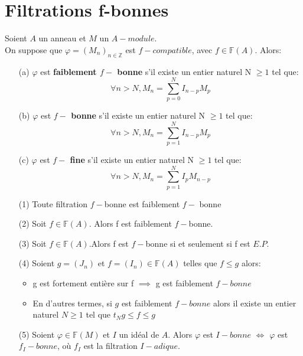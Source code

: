 \section{Filtrations f-bonnes}
\begin{madefinition}
	Soient $A$ un anneau et $M$ un $A-module$.\\
	On suppose que $\varphi=(M_n)_{n \in \mathbb{Z}}$ est $f-compatible$, avec $f \in \mathbb{F}(A)$. Alors:
	\begin{itemize}
		\item[(a)] $\varphi$ est \textbf{faiblement $f-$ bonne} s'il existe un entier naturel N $\geqslant 1$ tel que:
		\[\forall n > N, M_{n}=\sum_{p=0}^{N}I_{n-p}M_{p} \]
		\item[(b)] $\varphi$ est \textbf{$f-$ bonne} s'il existe un entier naturel N $\geqslant 1$ tel que:
		\[\forall n > N, M_{n}=\sum_{p=1}^{N}I_{n-p}M_{p} \]
		\item[(c)] $\varphi$ est \textbf{$f-$ fine} s'il existe un entier naturel N $\geqslant 1$ tel que:
		\[\forall n > N, M_{n}=\sum_{p=1}^{N}I_{p}M_{n-p} \]
	\end{itemize} 
\end{madefinition}
\begin{maremarque}
	\begin{enumerate}
		\item[(1)] Toute filtration $f-$bonne est faiblement $f-$ bonne
		\item[(2)] Soit $f \in \mathbb{F}(A)$. Alors f est faiblement $f-$bonne.
		\item[(3)] Soit $f \in \mathbb{F}(A)$.Alors f est $f-$bonne si et seulement si f est $E.P.$
		\item[(4)] Soient $g=(J_n)$ et $  f = (I_n) \in \mathbb{F}(A)$ telles que $f \leqslant g$ alors:
		\begin{itemize}
			\item g est fortement entière sur f $\implies$ g est faiblement $f-bonne$
			\item  En d'autres termes, si $g$ est faiblement $f-bonne$ alors il existe un entier naturel $N \geqslant 1$ tel que $t_{N}g \leqslant f \leqslant g$
		\end{itemize}
		\item[(5)] Soient $\varphi \in \mathbb{F}(M)$ et $I$ un idéal de $A$. Alors $\varphi$ est $I-bonne$ $\Longleftrightarrow$ $\varphi$ est $f_{I}-bonne$, où $f_{I}$ est la filtration $I-adique$.
	\end{enumerate}
\end{maremarque}
